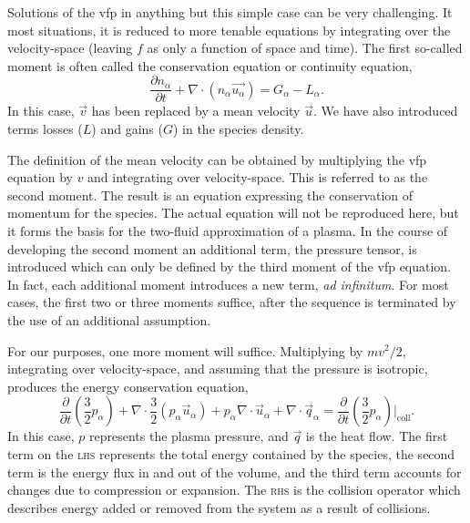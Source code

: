 Solutions of the \acs{vfp} in anything but this simple case can be very
challenging. It most situations, it is reduced to more tenable equations
by integrating over the velocity-space (leaving $f$ as only a function of
space and time). The first so-called moment is often called the conservation
equation or continuity equation,
\begin{equation}\label{eq:cont}
  \frac{\partial n_\alpha}{\partial t} + \nabla \cdot (n_\alpha \vec{u_\alpha})
  = G_\alpha - L_\alpha.
\end{equation}
In this case, $\vec{v}$ has been replaced by a mean velocity $\vec{u}$.
We have also introduced terms losses ($L$) and gains ($G$) in the
species density.

The definition of the mean velocity can be obtained by multiplying the
\acs{vfp} equation by $v$ and integrating over velocity-space. This is
referred to as the second moment. The result is an equation expressing
the conservation of momentum for the species. The actual equation will
not be reproduced here, but it forms the basis for the two-fluid
approximation of a plasma. In the course of developing the second
moment an additional term, the pressure tensor, is introduced which can
only be defined by the third moment of the \acs{vfp} equation. In fact,
each additional moment introduces a new term, \emph{ad infinitum}. For
most cases, the first two or three moments suffice, after the sequence
is terminated by the use of an additional assumption.

For our purposes, one more moment will suffice. Multiplying by $mv^2/2$,
integrating over velocity-space, and assuming that the pressure is
isotropic, produces the energy conservation equation,
\begin{equation}
  \frac{\partial}{\partial t}\left(\frac{3}{2}p_\alpha\right) 
  + \nabla\cdot\frac{3}{2} (p_\alpha\vec{u}_\alpha)
  + p_\alpha\nabla\cdot\vec{u}_\alpha
  + \nabla\cdot\vec{q}_\alpha
  = \frac{\partial}{\partial
  t}\left(\frac{3}{2}p_\alpha\right)\bigg|_\mathrm{coll}.
\end{equation}
In this case, $p$ represents the plasma pressure, and $\vec{q}$ is the
heat flow. The first term on the \textsc{lhs} represents the total
energy contained by the species, the second term is the energy flux in
and out of the volume, and the third term accounts for changes due to
compression or expansion. The \textsc{rhs} is the collision operator
which describes energy added or removed from the system as a result of
collisions.

